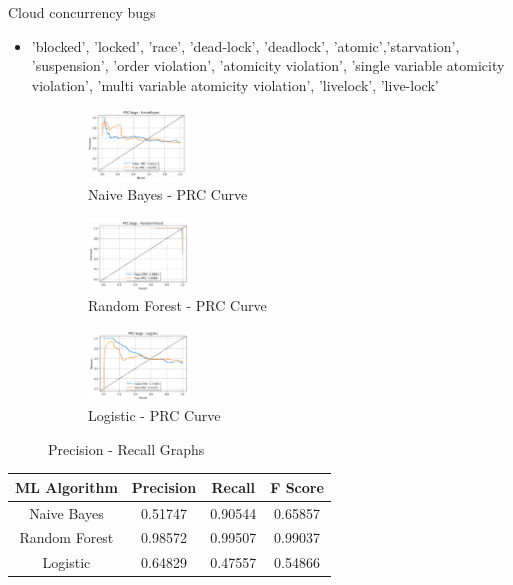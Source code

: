 \documentclass{seal_article}
\begin{document}
\vspace{0.5cm}
Cloud concurrency bugs

\begin{itemize}
\item  'blocked', 'locked', 'race', 'dead-lock', 'deadlock', 'atomic','starvation', 'suspension', 'order violation', 'atomicity violation', 'single variable atomicity violation', 'multi variable atomicity violation', 'livelock',  'live-lock'
\end{itemize}


\vspace{0.5cm}
\begin{figure}[h] 
\centering
\captionsetup{justification=centering}
\begin{subfigure}{.3\linewidth}
  \centering
  \includegraphics[width=2.7cm]{img/naive_cloud_concurrent.PNG}
  \caption{Naive Bayes - PRC Curve}
  \label{fig:sub1}
\end{subfigure}
\begin{subfigure}{.3\linewidth}
  \centering
  \includegraphics[width=2.7cm]{img/random_forest_cloud_concurrency.PNG}
  \caption{Random Forest - PRC Curve}
  \label{fig:sub1}
\end{subfigure}
\begin{subfigure}{.3\linewidth}
  \centering
  \includegraphics[width=2.7cm]{img/logistic_cloud_concurrency.PNG}
  \caption{Logistic - PRC Curve}
  \label{fig:sub2}
\end{subfigure}
\caption{Precision - Recall Graphs}
\label{fig.aug}
\end{figure} 
\begin{center}
 \begin{tabular}{||c c c c||} 
 \hline
 ML Algorithm &Precision & Recall & F Score   \\ [0.5ex] 
 \hline\hline
  Naive Bayes & 0.51747 & 0.90544 & 0.65857\\ 
 \hline
 Random Forest &  0.98572 & 0.99507 & 0.99037 \\
 \hline
 Logistic & 0.64829 & 0.47557 & 0.54866 \\
 \hline
\end{tabular}
\end{center}
\end{document}
